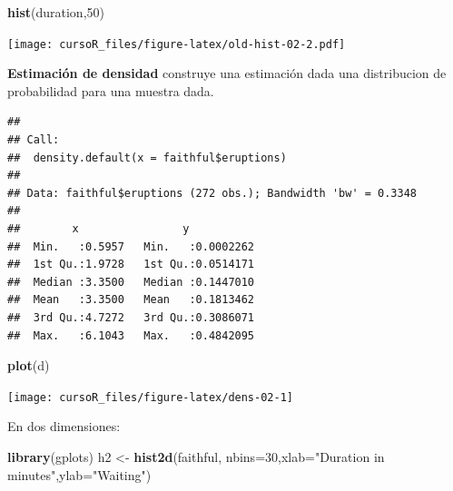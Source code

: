 \documentclass[]{book}
\newenvironment{Shaded}{\begin{snugshade}}{\end{snugshade}}
\newcommand{\KeywordTok}[1]{\textcolor[rgb]{0.13,0.29,0.53}{\textbf{#1}}}
\newcommand{\DataTypeTok}[1]{\textcolor[rgb]{0.13,0.29,0.53}{#1}}
\newcommand{\DecValTok}[1]{\textcolor[rgb]{0.00,0.00,0.81}{#1}}
\newcommand{\StringTok}[1]{\textcolor[rgb]{0.31,0.60,0.02}{#1}}
\newcommand{\OperatorTok}[1]{\textcolor[rgb]{0.81,0.36,0.00}{\textbf{#1}}}
\newcommand{\NormalTok}[1]{#1}
\begin{document}
\begin{Shaded}
\begin{Highlighting}[]
\KeywordTok{hist}\NormalTok{(duration,}\DecValTok{50}\NormalTok{)}
\end{Highlighting}
\end{Shaded}

\texttt{[image: cursoR\_files/figure-latex/old-hist-02-2.pdf]}

\textbf{Estimación de densidad} construye una estimación dada una
distribucion de probabilidad para una muestra dada.

\begin{Shaded}
\end{Shaded}

\begin{verbatim}
## 
## Call:
##  density.default(x = faithful$eruptions)
## 
## Data: faithful$eruptions (272 obs.); Bandwidth 'bw' = 0.3348
## 
##        x                y            
##  Min.   :0.5957   Min.   :0.0002262  
##  1st Qu.:1.9728   1st Qu.:0.0514171  
##  Median :3.3500   Median :0.1447010  
##  Mean   :3.3500   Mean   :0.1813462  
##  3rd Qu.:4.7272   3rd Qu.:0.3086071  
##  Max.   :6.1043   Max.   :0.4842095
\end{verbatim}

\begin{Shaded}
\begin{Highlighting}[]
\KeywordTok{plot}\NormalTok{(d)}
\end{Highlighting}
\end{Shaded}

\begin{center}\texttt{[image: cursoR\_files/figure-latex/dens-02-1]} \end{center}

En dos dimensiones:

\begin{Shaded}
\begin{Highlighting}[]
\KeywordTok{library}\NormalTok{(gplots)}
\NormalTok{h2 <-}\StringTok{ }\KeywordTok{hist2d}\NormalTok{(faithful, }\DataTypeTok{nbins=}\DecValTok{30}\NormalTok{,}\DataTypeTok{xlab=}\StringTok{"Duration in minutes"}\NormalTok{,}\DataTypeTok{ylab=}\StringTok{"Waiting"}\NormalTok{)}
\end{Highlighting}
\end{Shaded}
\end{document}
